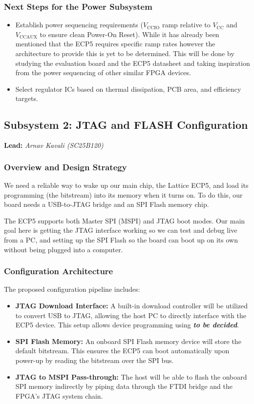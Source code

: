 \documentclass[12pt,a4paper]{article}
\begin{document}
\subsubsection{Next Steps for the Power Subsystem}
\begin{itemize}[leftmargin=1cm]
    \item Establish power sequencing requirements ($V_{\text{CCIO}}$ ramp relative to $V_{\text{CC}}$ and $V_{\text{CCAUX}}$ to ensure clean Power-On Reset). While it has already been mentioned that the ECP5 requires specific ramp rates however the architecture to provide this is yet to be determined. This will be done by studying the evaluation board and the ECP5 datasheet and taking inspiration from the power sequencing of other similar FPGA devices.
    \item Select regulator ICs based on thermal dissipation, PCB area, and efficiency targets.
\end{itemize}

\subsection{Subsystem 2: JTAG and FLASH Configuration}
\noindent\textbf{Lead:} \textit{Arnav Kavali (SC25B120)}
\subsubsection{Overview and Design Strategy}
We need a reliable way to wake up our main chip, the Lattice ECP5, and load its programming (the bitstream) into its memory when it turns on. To do this, our board needs a USB-to-JTAG bridge and an SPI Flash memory chip.

The ECP5 supports both Master SPI (MSPI) and JTAG boot modes. Our main goal here is getting the JTAG interface working so we can test and debug live from a PC, and setting up the SPI Flash so the board can boot up on its own without being plugged into a computer.


\subsubsection{Configuration Architecture}
The proposed configuration pipeline includes:
\begin{itemize}[leftmargin=1cm]
    \item \textbf{JTAG Download Interface:} A built-in download controller will be utilized to convert USB to JTAG, allowing the host PC to directly interface with the ECP5 device. This setup allows device programming using \textit{\textbf{to be decided}}.
    \item \textbf{SPI Flash Memory:} An onboard SPI Flash memory device will store the default bitstream. This ensures the ECP5 can boot automatically upon power-up by reading the bitstream over the SPI bus.
    \item \textbf{JTAG to MSPI Pass-through:} The host will be able to flash the onboard SPI memory indirectly by piping data through the FTDI bridge and the FPGA's JTAG system  chain.
\end{itemize}
\end{document}
